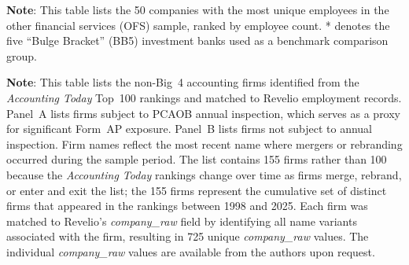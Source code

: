 \documentclass[11pt]{article}
\begin{document}
\clearpage
\begin{table}[h!]
\begin{flushleft}
    \begin{threeparttable}[b]
    \captionsetup{labelfont=bf, singlelinecheck=off, justification=raggedright, labelsep=none}
    \caption{: Largest employers in the other financial services sample}
    
    \begin{tablenotes}
        \footnotesize
        \item \textbf{Note}: This table lists the 50 companies with the most unique employees in the other financial services (OFS) sample, ranked by employee count. * denotes the five ``Bulge Bracket'' (BB5) investment banks used as a benchmark comparison group.
    \end{tablenotes}
    \label{table:employerTable}
    \end{threeparttable}
\end{flushleft}
\end{table}

\clearpage
\begin{table}[h!]
\begin{flushleft}
    \begin{threeparttable}[b]
    \captionsetup{labelfont=bf, singlelinecheck=off, justification=raggedright, labelsep=none}
    \caption{: Non-Big 4 accounting firms by PCAOB inspection status}
    
    \begin{tablenotes}
        \footnotesize
        \item \textbf{Note}: This table lists the non-Big~4 accounting firms identified from the \textit{Accounting Today} Top~100 rankings and matched to Revelio employment records. Panel~A lists firms subject to PCAOB annual inspection, which serves as a proxy for significant Form~AP exposure. Panel~B lists firms not subject to annual inspection. Firm names reflect the most recent name where mergers or rebranding occurred during the sample period. The list contains 155 firms rather than 100 because the \textit{Accounting Today} rankings change over time as firms merge, rebrand, or enter and exit the list; the 155 firms represent the cumulative set of distinct firms that appeared in the rankings between 1998 and 2025. Each firm was matched to Revelio's \textit{company\_raw} field by identifying all name variants associated with the firm, resulting in 725 unique \textit{company\_raw} values. The individual \textit{company\_raw} values are available from the authors upon request.
    \end{tablenotes}
    \label{table:nonB4Firms}
    \end{threeparttable}
\end{flushleft}
\end{table}

\clearpage
\begin{flushleft}

\end{flushleft}

% 
\end{document}
